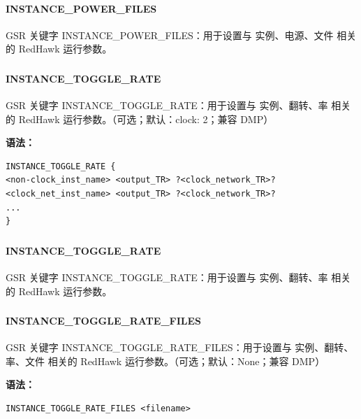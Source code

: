 \paragraph*{INSTANCE_POWER_FILES}

GSR 关键字 INSTANCE_POWER_FILES：用于设置与 实例、电源、文件 相关的 RedHawk 运行参数。

\subsubsection{}
\paragraph*{INSTANCE_TOGGLE_RATE}

GSR 关键字 INSTANCE_TOGGLE_RATE：用于设置与 实例、翻转、率 相关的 RedHawk 运行参数。（可选；默认：clock: 2；兼容 DMP）

\textbf{语法：}
\begin{lstlisting}
INSTANCE_TOGGLE_RATE {
<non-clock_inst_name> <output_TR> ?<clock_network_TR>?
<clock_net_inst_name> <output_TR> ?<clock_network_TR>?
...
}
\end{lstlisting}

\subsubsection{}
\paragraph*{INSTANCE_TOGGLE_RATE}

GSR 关键字 INSTANCE_TOGGLE_RATE：用于设置与 实例、翻转、率 相关的 RedHawk 运行参数。

\subsubsection{}
\paragraph*{INSTANCE_TOGGLE_RATE_FILES}

GSR 关键字 INSTANCE_TOGGLE_RATE_FILES：用于设置与 实例、翻转、率、文件 相关的 RedHawk 运行参数。（可选；默认：None；兼容 DMP）

\textbf{语法：}
\begin{lstlisting}
INSTANCE_TOGGLE_RATE_FILES <filename>
\end{lstlisting}

